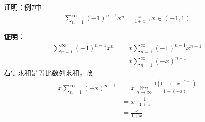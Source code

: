 \documentclass{article}
\begin{document}
\begin{zremark}
  证明：例7中
  \begin{align*}
    \sum\limits_{n = 1}^{\infty} (-1)^{n - 1} x^n = \frac{x}{1 + x} \, \, , x \in (-1, 1)
  \end{align*}
\end{zremark}
\textbf{证明：}
\begin{align*}
  \sum\limits_{n = 1}^{\infty} (-1)^{n - 1} x^n
   & = x \sum\limits_{n = 1}^{\infty} (-1)^{n - 1} x^{n - 1} \\
   & = x \sum\limits_{n = 1}^{\infty} (-x)^{n - 1}
\end{align*}
右侧求和是等比数列求和，故
\begin{align*}
  x \sum\limits_{n = 1}^{\infty} (-x)^{n - 1}
   & = x \lim\limits_{n \to \infty} \frac{1(1 - (-x)^{n - 1})}{1 - (-x)} \\
   & = x \cdot \frac{1}{1 + x} \\
   & = \frac{x}{1 + x} 
\end{align*}
\end{document}
